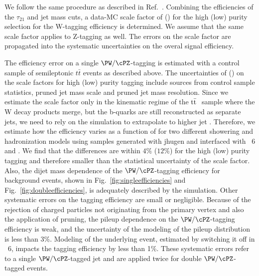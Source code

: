 We follow the same procedure as described in Ref.~\cite{JME-13-006}.
Combining the efficiencies of the $\tau_{21}$ and jet mass cuts, a data-MC scale factor of  \scalefactorHP
(\scalefactorLP) for the high (low) purity selection for the  W-tagging efficiency is determined.
We assume that the same scale factor applies to Z-tagging as well.
The errors on the scale factor are propagated
into the systematic uncertainties on the overal signal efficiency.





The efficiency error on a single $\PW/\cPZ$-tagging is estimated with
a control sample of semileptonic $t \bar t$ events as described above.
The uncertainties of \scalefactorHPu (\scalefactorLPu) on the scale
factors for high (low) purity tagging include sources from control
sample statistics, pruned jet mass scale and pruned jet mass
resolution.
Since we estimate the scale factor
only in the kinematic regime of the $\mathrm{t}\bar{\mathrm{t}}~$ sample where the W decay
products merge, but the b-quarks are still reconstructed as separate
jets, we need to rely on the simulation to extrapolate to
higher jet \pt.
Therefore, we estimate how the efficiency varies as a function of
\pt for two different showering and hadronization models using
\GBulk samples generated with {\sc jhugen} and interfaced with
\PYTHIA~6 and \HERWIG{++}.
We find that the differences are within $4\%$ ($12\%$)
for the high (low) purity tagging and therefore smaller than the
statistical uncertainty of the scale factor.
Also, the dijet mass dependence of the $\PW/\cPZ$-tagging efficiency for
background events, shown in Fig.~\ref{fig:singleefficiencies} and Fig.~\ref{fig:doubleefficiencies},
is adequately described by the simulation.
Other systematic errors on the tagging efficiency are small or
negligible.  Because of the rejection of charged particles not
originating from the primary vertex and also the application of
pruning, the pileup dependence on the $\PW/\cPZ$-tagging efficiency
is weak, and the uncertainty of the modeling of the pileup
distribution is less than 3\%.  Modeling of the underlying event,
estimated by switching it off in \PYTHIA~6, impacts the tagging
efficiency by less than 1\%.   These
systematic errors refer to a single $\PW/\cPZ$-tagged jet and are
applied twice for double $\PW/\cPZ$-tagged events.

